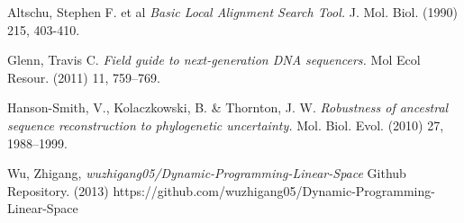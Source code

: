 \documentclass{article}
\begin{document}
\begin{thebibliography}{9}

	Altschu, Stephen F. et al
	\emph{Basic Local Alignment Search Tool.}
	J. Mol. Biol. (1990) 215, 403-410.
	
	Glenn, Travis C. 
	\emph{Field guide to next-generation DNA sequencers.}
	Mol Ecol Resour. (2011) 11, 759–769.

	Hanson-Smith, V., Kolaczkowski, B. \& Thornton, J. W. 
	\emph{Robustness of ancestral sequence reconstruction to phylogenetic uncertainty.}
	Mol. Biol. Evol. (2010) 27, 1988–1999.
	
  Wu, Zhigang,
  \emph{wuzhigang05/Dynamic-Programming-Linear-Space}
  Github Repository. (2013)
  https://github.com/wuzhigang05/Dynamic-Programming-Linear-Space

\end{thebibliography}
\end{document}
